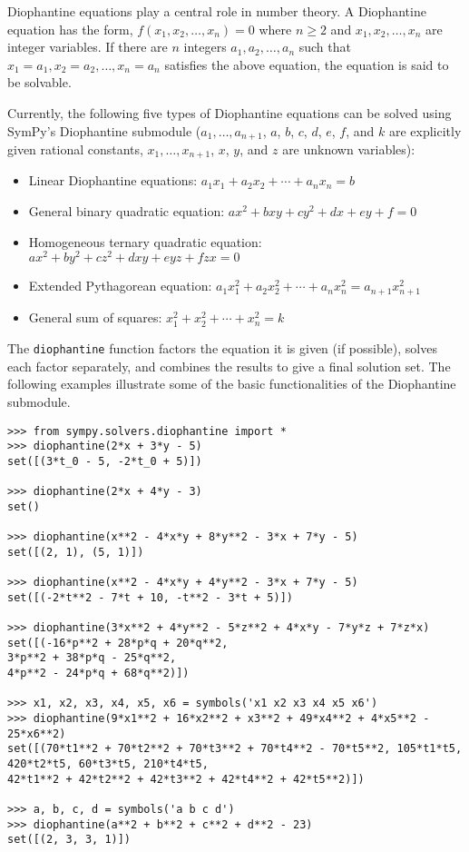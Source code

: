 Diophantine equations play a central role in number theory.  A
Diophantine equation has the form, $f(x_1, x_2, \dotsc, x_n) = 0$ where $n \geq
2$ and $x_1, x_2, \dotsc, x_n$ are integer variables. If there are $n$
integers $a_1, a_2, \dotsc, a_n$ such that $x_1 = a_1, x_2 = a_2, \dotsc, x_n =
a_n$ satisfies the above equation, the equation is said to be solvable.

Currently, the following five types of Diophantine equations can be solved using
SymPy's Diophantine submodule ($a_1, \ldots, a_{n+1}$, $a$, $b$, $c$, $d$, $e$,
$f$, and $k$ are explicitly given rational constants, $x_1, \ldots, x_{n+1}$,
$x$, $y$, and $z$ are unknown variables):

\begin{itemize}
    \item Linear Diophantine equations: $a_1x_1 + a_2x_2 + \dotsb{} + a_{n}x_{n} = b$
    \item General binary quadratic equation: $ax^2 + bxy + cy^2 + dx + ey + f = 0$
    \item Homogeneous ternary quadratic equation: $ax^2 + by^2 + cz^2 + dxy + eyz + fzx = 0$
    \item Extended Pythagorean equation: $a_{1}x_{1}^2 + a_{2}x_{2}^2 + \dotsb{} + a_{n}x_{n}^2 = a_{n+1}x_{n+1}^2$
    \item General sum of squares: $x_{1}^2 + x_{2}^2 + \dotsb{} + x_{n}^2 = k$
\end{itemize}

The \verb|diophantine| function factors the equation it is given (if
possible), solves each factor separately, and combines the results to give
a final solution set.
The following examples illustrate some of the
basic functionalities of the Diophantine submodule.

\begin{verbatim}
>>> from sympy.solvers.diophantine import *
>>> diophantine(2*x + 3*y - 5)
set([(3*t_0 - 5, -2*t_0 + 5)])

>>> diophantine(2*x + 4*y - 3)
set()

>>> diophantine(x**2 - 4*x*y + 8*y**2 - 3*x + 7*y - 5)
set([(2, 1), (5, 1)])

>>> diophantine(x**2 - 4*x*y + 4*y**2 - 3*x + 7*y - 5)
set([(-2*t**2 - 7*t + 10, -t**2 - 3*t + 5)])

>>> diophantine(3*x**2 + 4*y**2 - 5*z**2 + 4*x*y - 7*y*z + 7*z*x)
set([(-16*p**2 + 28*p*q + 20*q**2,
3*p**2 + 38*p*q - 25*q**2,
4*p**2 - 24*p*q + 68*q**2)])

>>> x1, x2, x3, x4, x5, x6 = symbols('x1 x2 x3 x4 x5 x6')
>>> diophantine(9*x1**2 + 16*x2**2 + x3**2 + 49*x4**2 + 4*x5**2 - 25*x6**2)
set([(70*t1**2 + 70*t2**2 + 70*t3**2 + 70*t4**2 - 70*t5**2, 105*t1*t5,
420*t2*t5, 60*t3*t5, 210*t4*t5,
42*t1**2 + 42*t2**2 + 42*t3**2 + 42*t4**2 + 42*t5**2)])

>>> a, b, c, d = symbols('a b c d')
>>> diophantine(a**2 + b**2 + c**2 + d**2 - 23)
set([(2, 3, 3, 1)])
\end{verbatim}
